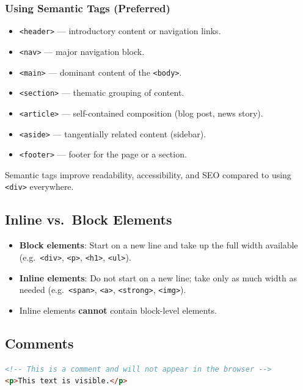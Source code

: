 \documentclass[hidelinks]{article}
\begin{document}
\subsubsection{Using Semantic Tags (Preferred)}
\begin{itemize}
  \item \texttt{<header>} --- introductory content or navigation links.
  \item \texttt{<nav>} --- major navigation block.
  \item \texttt{<main>} --- dominant content of the \texttt{<body>}.
  \item \texttt{<section>} --- thematic grouping of content.
  \item \texttt{<article>} --- self-contained composition (blog post, news story).
  \item \texttt{<aside>} --- tangentially related content (sidebar).
  \item \texttt{<footer>} --- footer for the page or a section.
\end{itemize}
Semantic tags improve readability, accessibility, and SEO compared to using \texttt{<div>} everywhere.

\subsection{Inline vs.\ Block Elements}
\begin{itemize}
  \item \textbf{Block elements}: Start on a new line and take up the full width available (e.g.\ \texttt{<div>}, \texttt{<p>}, \texttt{<h1>}, \texttt{<ul>}).
  \item \textbf{Inline elements}: Do not start on a new line; take only as much width as needed (e.g.\ \texttt{<span>}, \texttt{<a>}, \texttt{<strong>}, \texttt{<img>}).
  \item Inline elements \textbf{cannot} contain block-level elements.
\end{itemize}

\subsection{Comments}
\begin{lstlisting}[language=HTML, caption={HTML comment syntax}]
<!-- This is a comment and will not appear in the browser -->
<p>This text is visible.</p>
\end{lstlisting}
\end{document}
